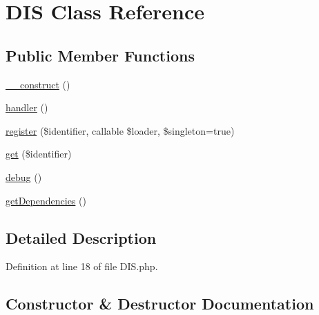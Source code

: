 \hypertarget{class_zest_1_1_common_1_1_container_1_1_d_i_s}{}\section{D\+IS Class Reference}
\label{class_zest_1_1_common_1_1_container_1_1_d_i_s}
\subsection*{Public Member Functions}
\begin{DoxyCompactItemize}
\item 
\mbox{\hyperlink{class_zest_1_1_common_1_1_container_1_1_d_i_s_a095c5d389db211932136b53f25f39685}{\+\_\+\+\_\+construct}} ()
\item 
\mbox{\hyperlink{class_zest_1_1_common_1_1_container_1_1_d_i_s_a501269111e2ae6a7d2af12117a6e84c0}{handler}} ()
\item 
\mbox{\hyperlink{class_zest_1_1_common_1_1_container_1_1_d_i_s_ab63ad3db9459165e573f406c9df125fc}{register}} (\$identifier, callable \$loader, \$singleton=true)
\item 
\mbox{\hyperlink{class_zest_1_1_common_1_1_container_1_1_d_i_s_a711e1d65eb5a7930db612a76ea3bddab}{get}} (\$identifier)
\item 
\mbox{\hyperlink{class_zest_1_1_common_1_1_container_1_1_d_i_s_aaed74f7942d3fc56582e99324500e87b}{debug}} ()
\item 
\mbox{\hyperlink{class_zest_1_1_common_1_1_container_1_1_d_i_s_a4f0d16046ea95ab73fa42d2aec2d1057}{get\+Dependencies}} ()
\end{DoxyCompactItemize}


\subsection{Detailed Description}


Definition at line 18 of file D\+I\+S.\+php.



\subsection{Constructor \& Destructor Documentation}
\mbox{\label{class_zest_1_1_common_1_1_container_1_1_d_i_s_a095c5d389db211932136b53f25f39685}} 
